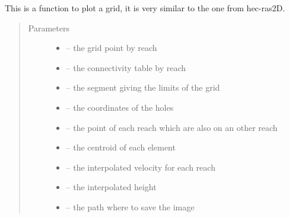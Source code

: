 \documentclass[letterpaper,10pt,english]{sphinxmanual}
\begin{document}
\begin{fulllineitems}
\label{\detokenize{index:src.manage_grid_8.plot_grid}}
This is a function to plot a grid, it is very similar to the one from hec-ras2D.
\begin{quote}\begin{description}
\item[{Parameters}] \leavevmode\begin{itemize}
\item {} 
 -- the grid point by reach

\item {} 
 -- the connectivity table by reach

\item {} 
 -- the segment giving the limits of the grid

\item {} 
 -- the coordinates of the holes

\item {} 
 -- the point of each reach which are also on an other reach

\item {} 
 -- the centroid of each element

\item {} 
 -- the interpolated velocity for each reach

\item {} 
 -- the interpolated height

\item {} 
 -- the path where to save the image

\end{itemize}

\end{description}\end{quote}

\end{fulllineitems}
\end{document}
